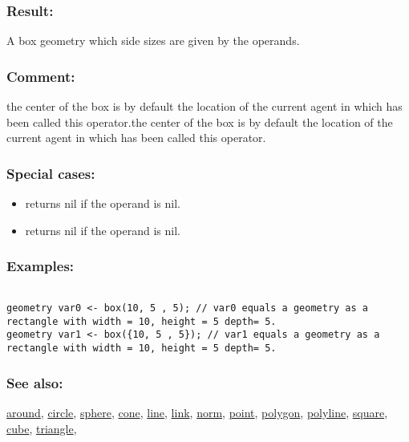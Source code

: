 \documentclass[]{book}
\providecommand{\tightlist}{%
  \setlength{\itemsep}{0pt}\setlength{\parskip}{0pt}}
\theoremstyle{definition}
\theoremstyle{definition}
\theoremstyle{definition}
\theoremstyle{remark}
\begin{document}
\subsubsection{Result:}\label{result-75}

A box geometry which side sizes are given by the operands.

\subsubsection{Comment:}\label{comment-16}

the center of the box is by default the location of the current agent in
which has been called this operator.the center of the box is by default
the location of the current agent in which has been called this
operator.

\subsubsection{Special cases:}\label{special-cases-26}

\begin{itemize}
\tightlist
\item
  returns nil if the operand is nil.\\
\item
  returns nil if the operand is nil.
\end{itemize}

\subsubsection{Examples:}\label{examples-58}

\begin{verbatim}
 
geometry var0 <- box(10, 5 , 5); // var0 equals a geometry as a rectangle with width = 10, height = 5 depth= 5. 
geometry var1 <- box({10, 5 , 5}); // var1 equals a geometry as a rectangle with width = 10, height = 5 depth= 5.
\end{verbatim}

\subsubsection{See also:}\label{see-also-47}

\href{OperatorsAA\#around}{around}, \href{OperatorsBC\#circle}{circle},
\href{OperatorsSZ\#sphere}{sphere}, \href{OperatorsBC\#cone}{cone},
\href{OperatorsIM\#line}{line}, \href{OperatorsIM\#link}{link},
\href{OperatorsNR\#norm}{norm}, \href{OperatorsNR\#point}{point},
\href{OperatorsNR\#polygon}{polygon},
\href{OperatorsNR\#polyline}{polyline},
\href{OperatorsSZ\#square}{square}, \href{OperatorsBC\#cube}{cube},
\href{OperatorsSZ\#triangle}{triangle},
\end{document}
